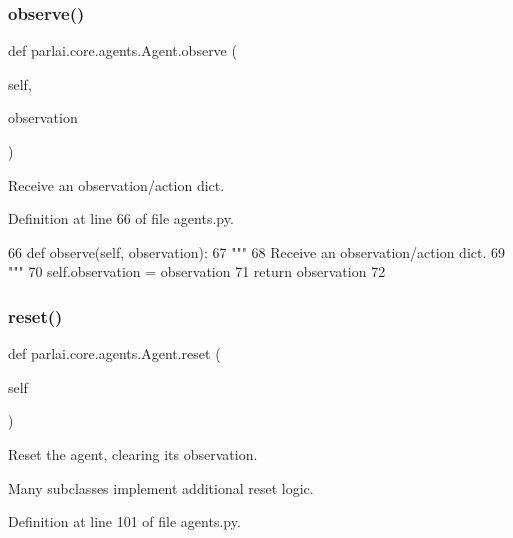 \subsubsection{\texorpdfstring{observe()}{observe()}}
{\footnotesize\ttfamily def parlai.\+core.\+agents.\+Agent.\+observe (\begin{DoxyParamCaption}\item[{}]{self,  }\item[{}]{observation }\end{DoxyParamCaption})}

\begin{DoxyVerb}Receive an observation/action dict.
\end{DoxyVerb}
 

Definition at line 66 of file agents.\+py.


\begin{DoxyCode}
66     \textcolor{keyword}{def }observe(self, observation):
67         \textcolor{stringliteral}{"""}
68 \textcolor{stringliteral}{        Receive an observation/action dict.}
69 \textcolor{stringliteral}{        """}
70         self.observation = observation
71         \textcolor{keywordflow}{return} observation
72 
\end{DoxyCode}
\mbox{\label{classparlai_1_1core_1_1agents_1_1Agent_a27cb8206372681605b00dc28b81a7c39}} 
\subsubsection{\texorpdfstring{reset()}{reset()}}
{\footnotesize\ttfamily def parlai.\+core.\+agents.\+Agent.\+reset (\begin{DoxyParamCaption}\item[{}]{self }\end{DoxyParamCaption})}

\begin{DoxyVerb}Reset the agent, clearing its observation.

Many subclasses implement additional reset logic.
\end{DoxyVerb}
 

Definition at line 101 of file agents.\+py.


